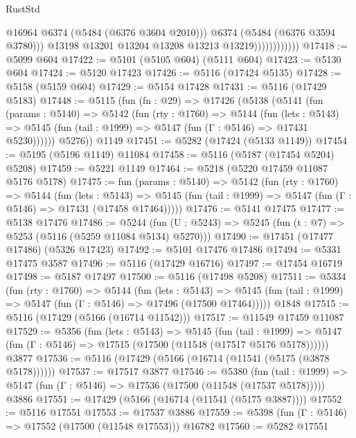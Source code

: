 \begin{lexlean}{RustStd}
\begin{coremodule}
                                @16964
                                @6374
                                (@5484 (@6376 @3604 @2010)))
                              @6374
                              (@5484 (@6376 @3594 @3780)))
                            @13198
                            @13201
                            @13204
                            @13208
                            @13213
                            @13219))))))))))))
@17418 := @5099 @604
@17422 := @5101 (@5105 @604) (@5111 @604)
@17423 := @5130 @604
@17424 := @5120 @17423
@17426 := @5116 (@17424 @5135)
@17428 := @5158 (@5159 @604)
@17429 := @5154 @17428
@17431 := @5116 (@17429 @5183)
@17448 := @5115
    (fun (fn : @29) =>
    @17426
      (@5138
        (@5141
          (fun (params : @5140) =>
          @5142
            (fun (rty : @1760) =>
            @5144
              (fun (lets : @5143) =>
              @5145 (fun (tail : @1999) => @5147 (fun (Γ : @5146) => @17431 @5230))))))
        @5276))
    @1149
@17451 := @5282 (@17424 (@5133 @1149))
@17454 := @5195 (@5196 @1149) @11084
@17458 := @5116 (@5187 (@17454 @5204) @5208)
@17459 := @5221 @1149
@17464 := @5218 (@5220 @17459 @11087 @5176 @5178)
@17475 := fun (params : @5140) =>
  @5142
    (fun (rty : @1760) =>
    @5144
      (fun (lets : @5143) =>
      @5145 (fun (tail : @1999) => @5147 (fun (Γ : @5146) => @17431 (@17458 @17464)))))
@17476 := @5141 @17475
@17477 := @5138 @17476
@17486 := @5244
    (fun (U : @5243) => @5245 (fun (t : @7) => @5253 (@5116 (@5259 @11084 @5134) @5270)))
@17490 := @17451 (@17477 @17486) (@5326 @17423)
@17492 := @5101 @17476 @17486
@17494 := @5331 @17475 @3587
@17496 := @5116 (@17429 @16716)
@17497 := @17454 @16719
@17498 := @5187 @17497
@17500 := @5116 (@17498 @5208)
@17511 := @5334
    (fun (rty : @1760) =>
    @5144
      (fun (lets : @5143) =>
      @5145 (fun (tail : @1999) => @5147 (fun (Γ : @5146) => @17496 (@17500 @17464)))))
    @1848
@17515 := @5116 (@17429 (@5166 (@16714 @11542)))
@17517 := @11549 @17459 @11087
@17529 := @5356
    (fun (lets : @5143) =>
    @5145
      (fun (tail : @1999) =>
      @5147 (fun (Γ : @5146) => @17515 (@17500 (@11548 (@17517 @5176 @5178))))))
    @3877
@17536 := @5116 (@17429 (@5166 (@16714 (@11541 (@5175 (@3878 @5178))))))
@17537 := @17517 @3877
@17546 := @5380
    (fun (tail : @1999) => @5147 (fun (Γ : @5146) => @17536 (@17500 (@11548 (@17537 @5178)))))
    @3886
@17551 := @17429 (@5166 (@16714 (@11541 (@5175 @3887))))
@17552 := @5116 @17551
@17553 := @17537 @3886
@17559 := @5398 (fun (Γ : @5146) => @17552 (@17500 (@11548 @17553))) @16782
@17560 := @5282 @17551

\end{coremodule}
\end{lexlean}
